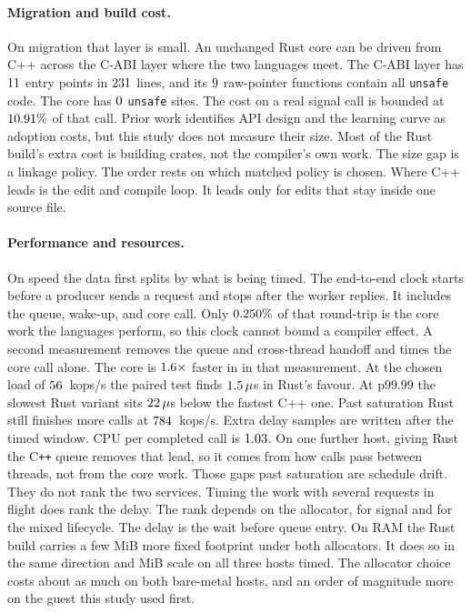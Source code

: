 \documentclass[english,oneside,a4paper,censored,csm,software-track-2020]{HYthesisML}
\begin{document}
\paragraph{Migration and build cost.}
On migration that layer is small. An unchanged Rust core
can be driven from C++ across the C-ABI layer where the two languages meet. The
C-ABI layer has $11$ entry points in $231$ lines, and its
$9$ raw-pointer functions contain all \texttt{unsafe} code. The
core has $0$ \texttt{unsafe} sites. The cost on a real signal call is
bounded at $10.91\%$ of that call.
Prior work identifies API design and the learning curve as adoption costs, but
this study does not measure their size.
Most of the Rust build's extra cost is building crates, not the
compiler's own work. The size gap is a linkage policy. The order
rests on which matched policy is chosen. Where C++ leads is the edit and compile
loop. It leads only for edits that stay inside one source file.

\paragraph{Performance and resources.}
On speed the data first splits by what is being timed. The end-to-end clock
starts before a producer sends a request and stops after the worker replies.
It includes the queue, wake-up, and core call. Only
$0.250\%$ of that round-trip is the core work the languages
perform, so this clock cannot bound a compiler effect. A second measurement
removes the queue and cross-thread handoff and times the core call alone. The
core is $1.6\times$ faster in \BudgetCoreFaster{} in that
measurement. At the chosen load of $56$~kops/s the paired test finds
$1.5\,\mu$s in Rust's favour. At p99.99 the slowest Rust variant sits
$22\,\mu$s below the fastest C++ one. Past saturation Rust still
finishes more calls at $784$~kops/s. Extra delay samples are written
after the timed window. CPU per completed call is
$1.03$. On one further host, giving Rust the
C\texttt{++} queue removes that lead, so it comes from how calls pass
between threads, not from the core work. Those gaps past saturation are schedule drift. They do not rank the two
services. Timing the work with several requests in flight does rank the delay.
The rank depends on the allocator, for signal and for the mixed lifecycle. The
delay is the wait before queue entry. On RAM
the Rust build carries a few MiB more fixed footprint under both allocators. It does so in
the same direction and MiB scale on all three hosts timed. The
allocator choice costs about as much on both bare-metal hosts, and an order of
magnitude more on the guest this study used first.
\end{document}
